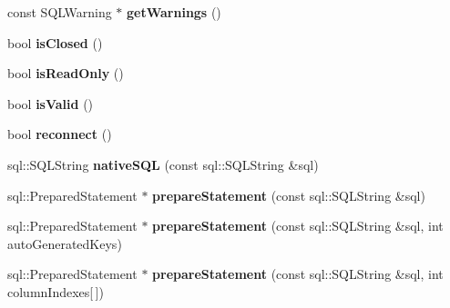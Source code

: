 \begin{DoxyCompactItemize}
\item 
const S\+Q\+L\+Warning $\ast$ {\bfseries get\+Warnings} ()\hypertarget{classsql_1_1mysql_1_1MySQL__Connection_a62b556bf59e83dae5bafd52cce4801a7}{}\label{classsql_1_1mysql_1_1MySQL__Connection_a62b556bf59e83dae5bafd52cce4801a7}

\item 
bool {\bfseries is\+Closed} ()\hypertarget{classsql_1_1mysql_1_1MySQL__Connection_a00820cf65fea6a9fd9cb936a6781db33}{}\label{classsql_1_1mysql_1_1MySQL__Connection_a00820cf65fea6a9fd9cb936a6781db33}

\item 
bool {\bfseries is\+Read\+Only} ()\hypertarget{classsql_1_1mysql_1_1MySQL__Connection_af395e4c12315d0dcf9e3a5abbcbb33e2}{}\label{classsql_1_1mysql_1_1MySQL__Connection_af395e4c12315d0dcf9e3a5abbcbb33e2}

\item 
bool {\bfseries is\+Valid} ()\hypertarget{classsql_1_1mysql_1_1MySQL__Connection_a081337e746b0eabcf0a7cb136b50277b}{}\label{classsql_1_1mysql_1_1MySQL__Connection_a081337e746b0eabcf0a7cb136b50277b}

\item 
bool {\bfseries reconnect} ()\hypertarget{classsql_1_1mysql_1_1MySQL__Connection_a19ebafbbc4bc37958bcc93c7fa0807e9}{}\label{classsql_1_1mysql_1_1MySQL__Connection_a19ebafbbc4bc37958bcc93c7fa0807e9}

\item 
sql\+::\+S\+Q\+L\+String {\bfseries native\+S\+QL} (const sql\+::\+S\+Q\+L\+String \&sql)\hypertarget{classsql_1_1mysql_1_1MySQL__Connection_a7242075ae362ec3fbe65194f7043abc4}{}\label{classsql_1_1mysql_1_1MySQL__Connection_a7242075ae362ec3fbe65194f7043abc4}

\item 
sql\+::\+Prepared\+Statement $\ast$ {\bfseries prepare\+Statement} (const sql\+::\+S\+Q\+L\+String \&sql)\hypertarget{classsql_1_1mysql_1_1MySQL__Connection_a5d4ab19b238692240183b849c84c2166}{}\label{classsql_1_1mysql_1_1MySQL__Connection_a5d4ab19b238692240183b849c84c2166}

\item 
sql\+::\+Prepared\+Statement $\ast$ {\bfseries prepare\+Statement} (const sql\+::\+S\+Q\+L\+String \&sql, int auto\+Generated\+Keys)\hypertarget{classsql_1_1mysql_1_1MySQL__Connection_a4b341cf31b1fadb55fa573d5fc570de7}{}\label{classsql_1_1mysql_1_1MySQL__Connection_a4b341cf31b1fadb55fa573d5fc570de7}

\item 
sql\+::\+Prepared\+Statement $\ast$ {\bfseries prepare\+Statement} (const sql\+::\+S\+Q\+L\+String \&sql, int column\+Indexes\mbox{[}$\,$\mbox{]})\hypertarget{classsql_1_1mysql_1_1MySQL__Connection_a02a26ce23b897f09189ddafd4b87849e}{}\label{classsql_1_1mysql_1_1MySQL__Connection_a02a26ce23b897f09189ddafd4b87849e}


\end{DoxyCompactItemize}
